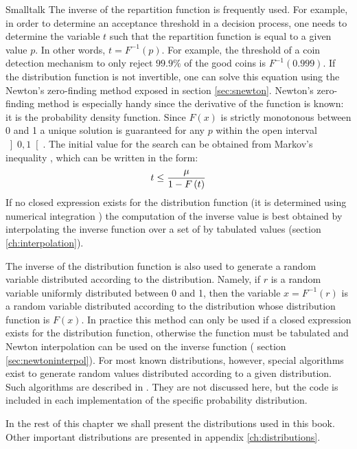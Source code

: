 \begin{displaycode}{Smalltalk}
The inverse of the repartition function is frequently used. For
example, in order to determine an acceptance threshold in a
decision process, one needs to determine the variable $t$ such
that the repartition function is equal to a given value $p$. In
other words, $t=F^{-1}\left(p\right)$. For example, the threshold
of a coin detection mechanism to only reject $99.9\%$ of the good
coins is $F^{-1}\left(0.999\right)$. If the distribution function
is not invertible, one can solve this equation using the Newton's
zero-finding method exposed in section \ref{sec:snewton}. Newton's
zero-finding method is especially handy since the derivative of
the function is known: it is the probability density function.
Since $F\left(x\right)$ is strictly monotonous between 0 and 1 a
unique solution is guaranteed for any $p$ within the open interval
$\left]0,1\right[$. The initial value for the search can be
obtained from Markov's inequality \cite{CorLeiRiv}, which can be
written in the form:
\begin{equation}
  t\le {\displaystyle \mu \over\displaystyle 1-F\left(t\right)}
\end{equation}
If no closed expression exists for the distribution function (it
is determined using numerical integration \eg) the computation of
the inverse value is best obtained by interpolating the inverse
function over a set of by tabulated values (\cf section
\ref{ch:interpolation}).

The inverse of the distribution function is also used to generate
a random variable distributed according to the distribution.
Namely, if $r$ is a random variable uniformly distributed between
0 and 1, then the variable $x=F^{-1}\left(r\right)$ is a random
variable distributed according to the distribution whose
distribution function is $F\left(x\right)$. In practice this
method can only be used if a closed expression exists for the
distribution function, otherwise the function must be tabulated
and Newton interpolation can be used on the inverse function (\cf
section \ref{sec:newtoninterpol}). For most known distributions,
however, special algorithms exist to generate random values
distributed according to a given distribution. Such algorithms are
described in \cite{LawKel}. They are not discussed here, but the
code is included in each implementation of the specific
probability distribution.

In the rest of this chapter we shall present the distributions
used in this book. Other important distributions are presented in
appendix \ref{ch:distributions}.


\end{displaycode}
